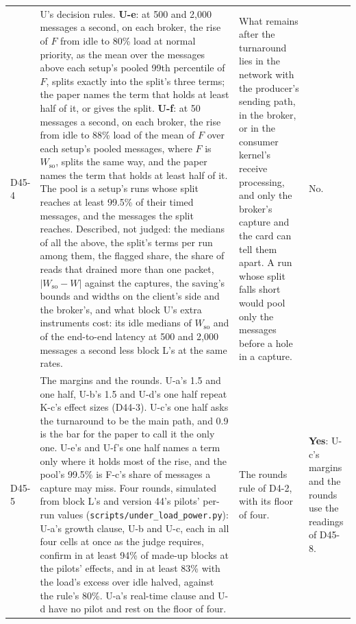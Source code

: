 \documentclass[11pt]{article}
\begin{document}
{\begin{longtable}{@{}p{1.1cm} >{\raggedright\arraybackslash}p{6.1cm} >{\raggedright\arraybackslash}p{6.0cm} >{\raggedright\arraybackslash}p{2.2cm}@{}}
D45-4 & U's decision rules. \textbf{U-e}: at 500 and 2,000 messages a second, on each broker, the rise of $F$ from idle to 80\% load at normal priority, as the mean over the messages above each setup's pooled 99th percentile of $F$, splits exactly into the split's three terms; the paper names the term that holds at least half of it, or gives the split. \textbf{U-f}: at 50 messages a second, on each broker, the rise from idle to 88\% load of the mean of $F$ over each setup's pooled messages, where $F$ is $W_{\mathrm{so}}$, splits the same way, and the paper names the term that holds at least half of it. The pool is a setup's runs whose split reaches at least 99.5\% of their timed messages, and the messages the split reaches. Described, not judged: the medians of all the above, the split's terms per run among them, the flagged share, the share of reads that drained more than one packet, $|W_{\mathrm{so}} - W|$ against the captures, the saving's bounds and widths on the client's side and the broker's, and what block U's extra instruments cost: its idle medians of $W_{\mathrm{so}}$ and of the end-to-end latency at 500 and 2,000 messages a second less block L's at the same rates. & What remains after the turnaround lies in the network with the producer's sending path, in the broker, or in the consumer kernel's receive processing, and only the broker's capture and the card can tell them apart. A run whose split falls short would pool only the messages before a hole in a capture. & No. \\
D45-5 & The margins and the rounds. U-a's 1.5 and one half, U-b's 1.5 and U-d's one half repeat K-c's effect sizes (D44-3). U-c's one half asks the turnaround to be the main path, and 0.9 is the bar for the paper to call it the only one. U-e's and U-f's one half names a term only where it holds most of the rise, and the pool's 99.5\% is F-c's share of messages a capture may miss. Four rounds, simulated from block L's and version 44's pilots' per-run values (\texttt{scripts/under\_load\_power.py}): U-a's growth clause, U-b and U-c, each in all four cells at once as the judge requires, confirm in at least 94\% of made-up blocks at the pilots' effects, and in at least 83\% with the load's excess over idle halved, against the rule's 80\%. U-a's real-time clause and U-d have no pilot and rest on the floor of four. & The rounds rule of D4-2, with its floor of four. & \textbf{Yes}: U-c's margins and the rounds use the readings of D45-8. \\

\end{longtable}}
\end{document}
